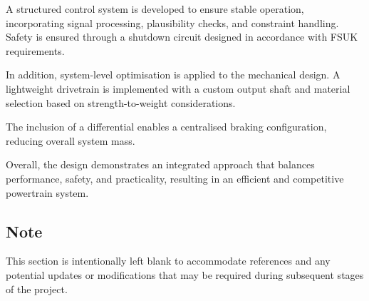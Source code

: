 \documentclass[a4paper,12pt]{article}
\begin{document}
A structured control system is developed to ensure stable operation, incorporating signal processing, plausibility checks, and constraint handling. Safety is ensured through a shutdown circuit designed in accordance with FSUK requirements.

In addition, system-level optimisation is applied to the mechanical design. A lightweight drivetrain is implemented with a custom output shaft and material selection based on strength-to-weight considerations.

The inclusion of a differential enables a centralised braking configuration, reducing overall system mass.

Overall, the design demonstrates an integrated approach that balances performance, safety, and practicality, resulting in an efficient and competitive powertrain system.

\subsection*{Note}

This section is intentionally left blank to accommodate references and any potential updates or modifications that may be required during subsequent stages of the project.
\end{document}
